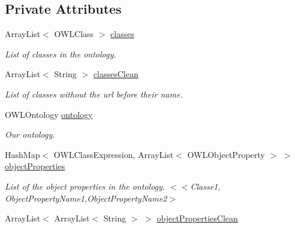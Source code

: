 \subsection*{Private Attributes}
\begin{DoxyCompactItemize}
\item 
\hypertarget{class_ontology_1_1_object_property_a0fb4e9a0cfa7cb785880cd19764cb80c}{
ArrayList$<$ OWLClass $>$ \hyperlink{class_ontology_1_1_object_property_a0fb4e9a0cfa7cb785880cd19764cb80c}{classes}}
\label{class_ontology_1_1_object_property_a0fb4e9a0cfa7cb785880cd19764cb80c}

\begin{DoxyCompactList}\small\item\em List of classes in the ontology. \end{DoxyCompactList}\item 
\hypertarget{class_ontology_1_1_object_property_aa8e9d767788209520016911f53bb0f58}{
ArrayList$<$ String $>$ \hyperlink{class_ontology_1_1_object_property_aa8e9d767788209520016911f53bb0f58}{classesClean}}
\label{class_ontology_1_1_object_property_aa8e9d767788209520016911f53bb0f58}

\begin{DoxyCompactList}\small\item\em List of classes without the url before their name. \end{DoxyCompactList}\item 
\hypertarget{class_ontology_1_1_object_property_a29d4ef0f8ba3a809b35cc36b6863f122}{
OWLOntology \hyperlink{class_ontology_1_1_object_property_a29d4ef0f8ba3a809b35cc36b6863f122}{ontology}}
\label{class_ontology_1_1_object_property_a29d4ef0f8ba3a809b35cc36b6863f122}

\begin{DoxyCompactList}\small\item\em Our ontology. \end{DoxyCompactList}\item 
\hypertarget{class_ontology_1_1_object_property_a887a6b686410445bba4c74fa0b650168}{
HashMap$<$ OWLClassExpression, ArrayList$<$ OWLObjectProperty $>$ $>$ \hyperlink{class_ontology_1_1_object_property_a887a6b686410445bba4c74fa0b650168}{objectProperties}}
\label{class_ontology_1_1_object_property_a887a6b686410445bba4c74fa0b650168}

\begin{DoxyCompactList}\small\item\em List of the object properties in the ontology.  $<$$<$Classe1, ObjectPropertyName1,ObjectPropertyName2$>$ \end{DoxyCompactList}\item 
\hypertarget{class_ontology_1_1_object_property_afed9e7e803a7a9a541d1057936b2edaf}{
ArrayList$<$ ArrayList$<$ String $>$ $>$ \hyperlink{class_ontology_1_1_object_property_afed9e7e803a7a9a541d1057936b2edaf}{objectPropertiesClean}}
\label{class_ontology_1_1_object_property_afed9e7e803a7a9a541d1057936b2edaf}


\end{DoxyCompactItemize}
